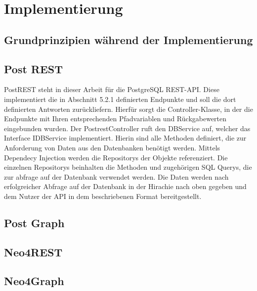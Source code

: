 \chapter{Implementierung} %
\label{sec:implementierung}

\section{Grundprinzipien während der Implementierung} %
\label{sec:datenmodell}

\section{Post REST} %
\label{sec:postrest}
PostREST steht in dieser Arbeit für die PostgreSQL REST-API. Diese implementiert die in Abschnitt 5.2.1 definierten Endpunkte und soll die dort definierten Antworten zurückliefern. Hierfür sorgt die Controller-Klasse, in der die Endpunkte mit Ihren entsprechenden Pfadvariablen und Rückgabewerten eingebunden wurden. Der PostrestController ruft den DBService auf, welcher das Interface IDBService implementiert. Hierin sind alle Methoden definiert, die zur Anforderung von Daten aus den Datenbanken benötigt werden. Mittels Dependecy Injection werden die Repositorys der Objekte referenziert. Die einzelnen Repositorys beinhalten die Methoden und zugehörigen SQL Querys, die zur abfrage auf der Datenbank verwendet werden. Die Daten werden nach erfolgreicher Abfrage auf der Datenbank in der Hirachie nach oben gegeben und dem Nutzer der API in dem beschriebenen Format bereitgestellt.

\section{Post Graph} %
\label{sec:postgraph}

\section{Neo4REST} %
\label{sec:neo4rest}

\section{Neo4Graph} %
\label{sec:neo4graph}

